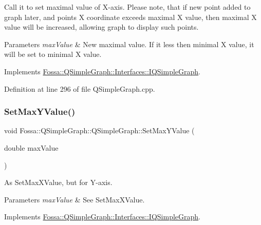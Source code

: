 Call it to set maximal value of X-\/axis. Please note, that if new point added to graph later, and point\textquotesingle{}s X coordinate exceeds maximal X value, then maximal X value will be increased, allowing graph to display such points. 


\begin{DoxyParams}{Parameters}
{\em max\+Value} & New maximal value. If it less then minimal X value, it will be set to minimal X value. \\
\hline
\end{DoxyParams}


Implements \hyperlink{class_fossa_1_1_q_simple_graph_1_1_interfaces_1_1_i_q_simple_graph_a04e7ec46c2be46257bef53c7bf978a2a}{Fossa\+::\+Q\+Simple\+Graph\+::\+Interfaces\+::\+I\+Q\+Simple\+Graph}.



Definition at line 296 of file Q\+Simple\+Graph.\+cpp.

\mbox{\label{class_fossa_1_1_q_simple_graph_1_1_q_simple_graph_a6cb6eee80dc489f300e32263833cf1cd}} 
\subsubsection{\texorpdfstring{Set\+Max\+Y\+Value()}{SetMaxYValue()}}
{\footnotesize\ttfamily void Fossa\+::\+Q\+Simple\+Graph\+::\+Q\+Simple\+Graph\+::\+Set\+Max\+Y\+Value (\begin{DoxyParamCaption}\item[{double}]{max\+Value }\end{DoxyParamCaption})\hspace{0.3cm}{\ttfamily [virtual]}}



As Set\+Max\+X\+Value, but for Y-\/axis. 


\begin{DoxyParams}{Parameters}
{\em max\+Value} & See Set\+Max\+X\+Value. \\
\hline
\end{DoxyParams}


Implements \hyperlink{class_fossa_1_1_q_simple_graph_1_1_interfaces_1_1_i_q_simple_graph_a09e04c116810e79ca1663d2075477746}{Fossa\+::\+Q\+Simple\+Graph\+::\+Interfaces\+::\+I\+Q\+Simple\+Graph}.



